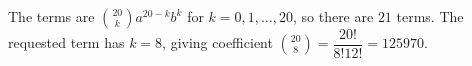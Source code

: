 The terms are $\binom{20}{k}a^{20-k}b^k$ for $k=0,1,\ldots,20$, so there are $\boxed{21}$ terms. The requested term has $k=8$, giving coefficient $\binom{20}{8}=\dfrac{20!}{8!12!}=\boxed{125970}$.
